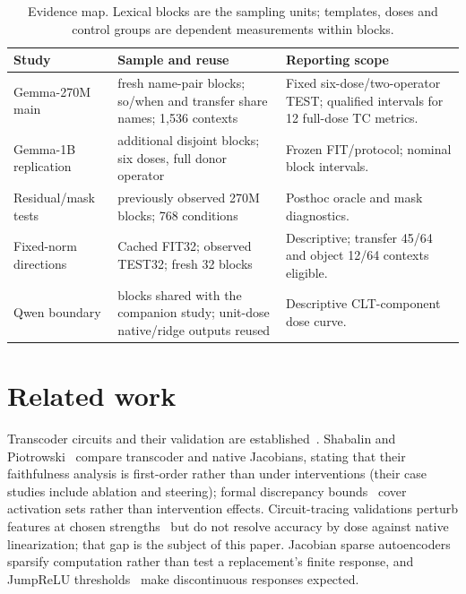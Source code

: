 \documentclass[11pt]{article}
\begin{document}
\begin{table}[ht]\centering\scriptsize
\setlength{\tabcolsep}{4pt}
\begin{tabular}{>{\raggedright\arraybackslash}p{}>{\raggedright\arraybackslash}p{}>{\raggedright\arraybackslash}p{}}\toprule
Study & Sample and reuse & Reporting scope\\\midrule
Gemma-270M main & 256 fresh name-pair blocks; so/when and transfer share names; 1,536 contexts & Fixed six-dose/two-operator TEST; qualified intervals for 12 full-dose TC metrics.\\[3pt]
Gemma-1B replication & 256 additional disjoint blocks; six doses, full donor operator & Frozen FIT/protocol; nominal block intervals.\\[3pt]
Residual/mask tests & 32 previously observed 270M blocks; 768 conditions & Posthoc oracle and mask diagnostics.\\[3pt]
Fixed-norm directions & Cached FIT32; observed TEST32; fresh 32 blocks & Descriptive; transfer 45/64 and object 12/64 contexts eligible.\\[3pt]
Qwen boundary & 256 blocks shared with the companion study; unit-dose native/ridge outputs reused & Descriptive CLT-component dose curve.\\\bottomrule
\end{tabular}
\caption{Evidence map. Lexical blocks are the sampling units; templates, doses and control groups are dependent measurements within blocks.}\label{tab:scope}
\end{table}

\section{Related work}
Transcoder circuits and their validation are established~\cite{dunefsky2024,ameisen2025}. Shabalin and Piotrowski~\cite{shabalin2026} compare transcoder and native Jacobians, stating that their faithfulness analysis is first-order rather than under interventions (their case studies include ablation and steering); formal discrepancy bounds~\cite{ladner2026} cover activation sets rather than intervention effects. Circuit-tracing validations perturb features at chosen strengths~\cite{ameisen2025} but do not resolve accuracy by dose against native linearization; that gap is the subject of this paper. Jacobian sparse autoencoders~\cite{farnik2025} sparsify computation rather than test a replacement's finite response, and JumpReLU thresholds~\cite{rajamanoharan2024} make discontinuous responses expected.
\end{document}
